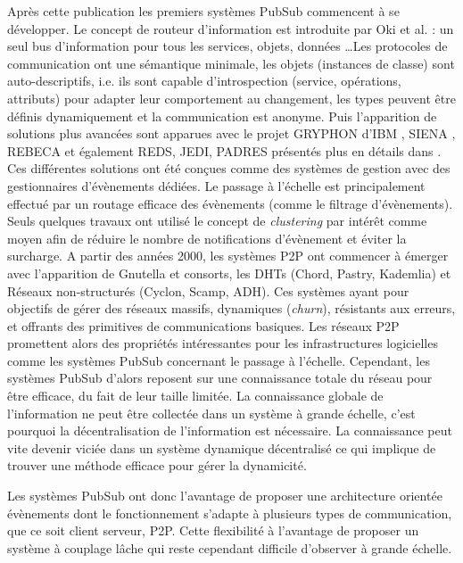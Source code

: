 Après cette publication les premiers systèmes \gls{PubSub} commencent à 
se développer. Le concept de routeur d'information est introduite par Oki et al. 
\cite{Oki1993} : un seul bus d'information pour tous les services, objets, données 
\ldots Les protocoles de communication ont une sémantique minimale, 
les objets (instances de classe) sont auto-descriptifs, i.e. ils sont 
capable d'introspection (service, opérations, attributs) pour adapter leur 
comportement au changement, les types peuvent être définis dynamiquement et 
la communication est anonyme. 
Puis l'apparition de solutions plus avancées sont apparues avec le projet 
GRYPHON d'IBM \cite{Banavar1999}, SIENA \cite{Carzaniga2000}, REBECA 
\cite{Parzyjegla2010} et également REDS, JEDI, PADRES présentés plus en 
détails dans \cite{Tarkoma2012}.
Ces différentes solutions ont été conçues comme des systèmes de gestion avec 
des gestionnaires d'évènements dédiées. Le passage à l'échelle est 
principalement effectué par un routage efficace des évènements (comme le 
filtrage d'évènements). Seuls quelques travaux ont utilisé le concept de 
\textit{clustering} par intérêt comme moyen afin de réduire le nombre de 
notifications d'évènement et éviter la surcharge. 
A partir des années 2000, les 
systèmes \gls{P2P} ont commencer à émerger avec 
l'apparition de Gnutella et consorts, les \glspl{DHT} (Chord, Pastry, Kademlia) et  
Réseaux non-structurés (Cyclon, Scamp, ADH). Ces systèmes ayant pour 
objectifs de gérer des réseaux massifs, dynamiques (\textit{churn}), résistants 
aux 
erreurs, et offrants des primitives de communications basiques.
Les réseaux \gls{P2P} promettent alors des propriétés intéressantes pour les 
infrastructures logicielles comme les systèmes \gls{PubSub} concernant le passage à 
l'échelle. Cependant, les systèmes \gls{PubSub} d'alors reposent sur une connaissance 
totale du réseau pour être efficace, du fait de leur taille limitée. La connaissance 
globale de l'information ne peut être collectée dans un système à grande échelle, 
c'est pourquoi la décentralisation de l'information est nécessaire. La connaissance 
peut vite devenir viciée dans un système dynamique décentralisé ce qui implique 
de trouver une méthode efficace pour gérer la dynamicité.

Les systèmes \gls{PubSub} ont donc l'avantage de proposer une architecture orientée évènements dont le fonctionnement s'adapte à plusieurs types de communication, que ce soit client serveur, P2P. Cette flexibilité à l'avantage de proposer un système à couplage lâche qui reste cependant difficile d'observer à grande échelle.

